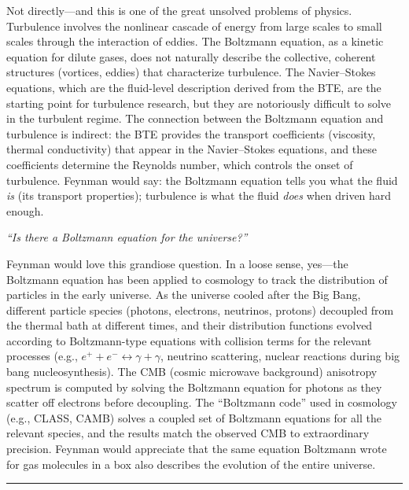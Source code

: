 \documentclass[11pt,openright]{book}
\begin{document}
Not directly---and this is one of the great unsolved problems of physics. Turbulence involves the nonlinear cascade of energy from large scales to small scales through the interaction of eddies. The Boltzmann equation, as a kinetic equation for dilute gases, does not naturally describe the collective, coherent structures (vortices, eddies) that characterize turbulence. The Navier--Stokes equations, which are the fluid-level description derived from the BTE, are the starting point for turbulence research, but they are notoriously difficult to solve in the turbulent regime. The connection between the Boltzmann equation and turbulence is indirect: the BTE provides the transport coefficients (viscosity, thermal conductivity) that appear in the Navier--Stokes equations, and these coefficients determine the Reynolds number, which controls the onset of turbulence. Feynman would say: the Boltzmann equation tells you what the fluid \emph{is} (its transport properties); turbulence is what the fluid \emph{does} when driven hard enough.

\textit{``Is there a Boltzmann equation for the universe?''}

Feynman would love this grandiose question. In a loose sense, yes---the Boltzmann equation has been applied to cosmology to track the distribution of particles in the early universe. As the universe cooled after the Big Bang, different particle species (photons, electrons, neutrinos, protons) decoupled from the thermal bath at different times, and their distribution functions evolved according to Boltzmann-type equations with collision terms for the relevant processes (e.g., $e^+ + e^- \leftrightarrow \gamma + \gamma$, neutrino scattering, nuclear reactions during big bang nucleosynthesis). The CMB (cosmic microwave background) anisotropy spectrum is computed by solving the Boltzmann equation for photons as they scatter off electrons before decoupling. The ``Boltzmann code'' used in cosmology (e.g., CLASS, CAMB) solves a coupled set of Boltzmann equations for all the relevant species, and the results match the observed CMB to extraordinary precision. Feynman would appreciate that the same equation Boltzmann wrote for gas molecules in a box also describes the evolution of the entire universe.

\bigskip
\hrule
\bigskip

\end{document}
